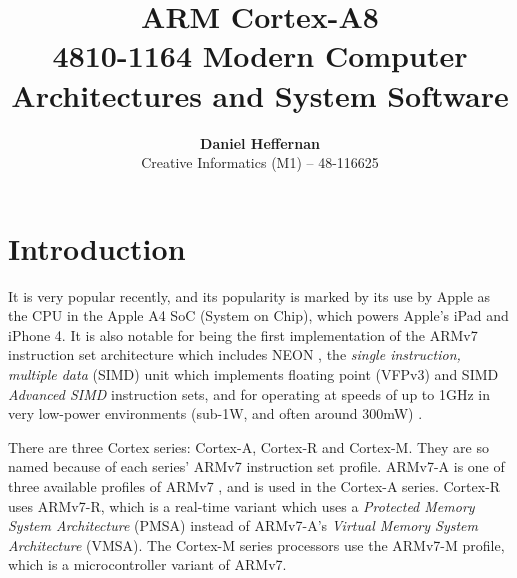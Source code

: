 \documentclass[oneside,a4paper]{report}
\title{ \textbf{ARM Cortex-A8} \\ \large{4810-1164 Modern Computer Architectures and System Software}}
\author{ \textbf{Daniel Heffernan} \\ Creative Informatics (M1) -- 48-116625 }
\begin{document}
\ifpdf
{}
\else
{}
\fi

\maketitle

\chapter{Introduction}

It is very popular recently, and its popularity is marked by its use by Apple as the CPU in the Apple A4 SoC (System on Chip), which powers Apple's iPad and iPhone 4. It is also notable for being the first implementation of the ARMv7 instruction set architecture which includes NEON \cite{Gris}, the \emph{single instruction, multiple data} (SIMD) unit which implements floating point (VFPv3) and SIMD \emph{Advanced SIMD} instruction sets, and for operating at speeds of up to 1GHz in very low-power environments (sub-1W, and often around 300mW) \cite{Williamson}.

There are three Cortex series: Cortex-A, Cortex-R and Cortex-M. They are so named because of each series' ARMv7 instruction set profile. ARMv7-A is one of three available profiles of ARMv7 \cite[p. A1-4]{ARMRef}, and is used in the Cortex-A series. Cortex-R uses ARMv7-R, which is a real-time variant which uses a \emph{Protected Memory System Architecture} (PMSA) instead of ARMv7-A's \emph{Virtual Memory System Architecture} (VMSA). The Cortex-M series processors use the ARMv7-M profile, which is a microcontroller variant of ARMv7.
\end{document}

